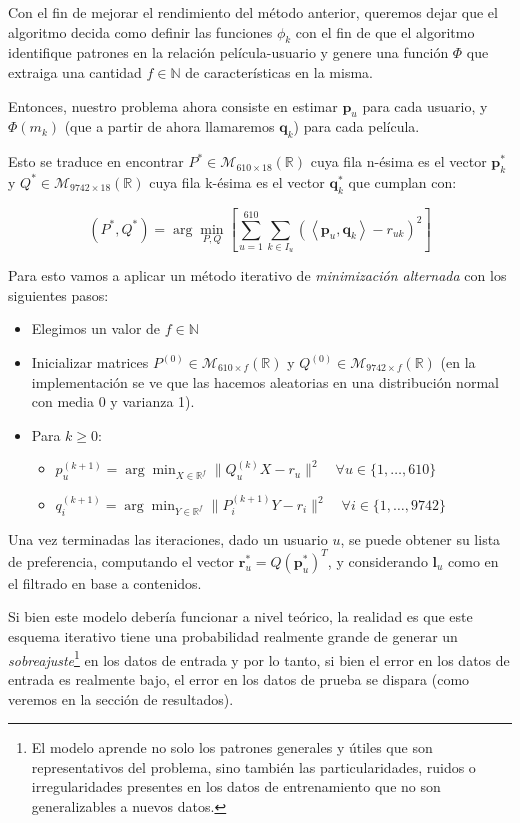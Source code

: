 \documentclass[12pt,a4paper]{article}
\begin{document}
Con el fin de mejorar el rendimiento del método anterior, queremos dejar que el algoritmo decida como definir las funciones \(\phi_k\) con el fin de que el algoritmo identifique patrones en la relación película-usuario y genere una función \(\Phi\) que extraiga una cantidad \(f \in \mathbb{N}\) de características en la misma.


Entonces, nuestro problema ahora consiste en estimar \(\mathbf{p}_u\) para cada usuario, y \(\Phi(m_k)\) (que a partir de ahora llamaremos \(\mathbf{q}_k\)) para cada película.

Esto se traduce en encontrar \(P^* \in \mathcal{M}_{610\times18}(\mathbb{R})\) cuya fila n-ésima es el vector \(\mathbf{p}^*_k\) y \(Q^* \in \mathcal{M}_{9742\times18}(\mathbb{R})\) cuya fila k-ésima es el vector \(\mathbf{q}^*_k\) que cumplan con:

\[
  (P^*, Q^*) = \arg\min_{P, Q}  \left[\sum_{u=1}^{610} \sum_{k \in I_u} (\left\langle \mathbf{p}_u, \mathbf{q}_k \right\rangle - r_{uk})^2 \right]
\]

Para esto vamos a aplicar un método iterativo de \textit{minimización alternada} con los siguientes pasos:

\begin{itemize}
  \item Elegimos un valor de \(f \in \mathbb{N}\)
  \item Inicializar matrices \( P^{(0)} \in \mathcal{M}_{610 \times f}(\mathbb{R}) \) y \( Q^{(0)} \in \mathcal{M}_{9742 \times f}(\mathbb{R}) \) (en la implementación se ve que las hacemos aleatorias en una distribución normal con media 0 y varianza 1).
  \item Para \( k \geq 0 \):
        \begin{itemize}
          \item \( p_u^{(k+1)} = \arg\min_{X \in \mathbb{R}^f} \| Q_u^{(k)} X - r_u \|^2 \quad \forall u \in \{1, \dots, 610\} \)
          \item \( q_i^{(k+1)} = \arg\min_{Y \in \mathbb{R}^f} \| P_i^{(k+1)} Y - r_i \|^2 \quad \forall i \in \{1, \dots, 9742\} \)
        \end{itemize}
\end{itemize}

Una vez terminadas las iteraciones, dado un usuario \(u\), se puede obtener su lista de preferencia, computando el vector \(\mathbf{r}^*_u = Q (\mathbf{p}^{*}_u)^T\), y considerando \(\mathbf{l}_u\) como en el filtrado en base a contenidos.

Si bien este modelo debería funcionar a nivel teórico, la realidad es que este esquema iterativo tiene una probabilidad realmente grande de generar un \textit{sobreajuste}\footnote{El modelo aprende no solo los patrones generales y útiles que son representativos del problema, sino también las particularidades, ruidos o irregularidades presentes en los datos de entrenamiento que no son generalizables a nuevos datos.} en los datos de entrada y por lo tanto, si bien el error en los datos de entrada es realmente bajo, el error en los datos de prueba se dispara (como veremos en la sección de resultados).
\end{document}
